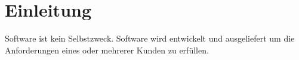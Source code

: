 \chapter{Einleitung}

Software ist kein Selbstzweck. Software wird entwickelt und ausgeliefert um die Anforderungen eines oder mehrerer Kunden zu erfüllen.